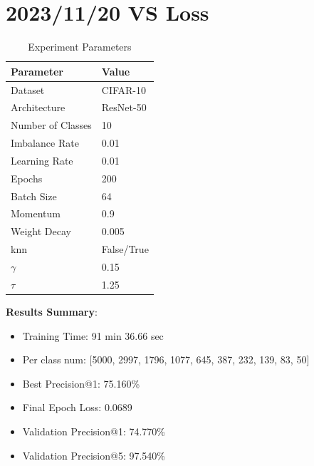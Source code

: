 \documentclass{article}
\begin{document}
\section{2023/11/20 VS Loss}
\begin{table}[h!]
\centering
\caption{Experiment Parameters}
\label{tab:parameters_vs}
\begin{tabular}{ll}
\toprule
Parameter & Value \\
\midrule
Dataset & CIFAR-10 \\
Architecture & ResNet-50 \\
Number of Classes & 10 \\
Imbalance Rate & 0.01 \\
Learning Rate & 0.01 \\
Epochs & 200 \\
Batch Size & 64 \\
Momentum & 0.9 \\
Weight Decay & 0.005 \\
knn & False/True \\
\(\gamma\) & 0.15 \\
\(\tau\) & 1.25 \\
\bottomrule
\end{tabular}
\end{table}

\textbf{Results Summary}:
\begin{itemize}
    \item Training Time: 91 min 36.66 sec
    \item Per class num: [5000, 2997, 1796, 1077, 645, 387, 232, 139, 83, 50]
    \item Best Precision@1: 75.160\%
    \item Final Epoch Loss: 0.0689
    \item Validation Precision@1: 74.770\%
    \item Validation Precision@5: 97.540\%
\end{itemize}
\end{document}
